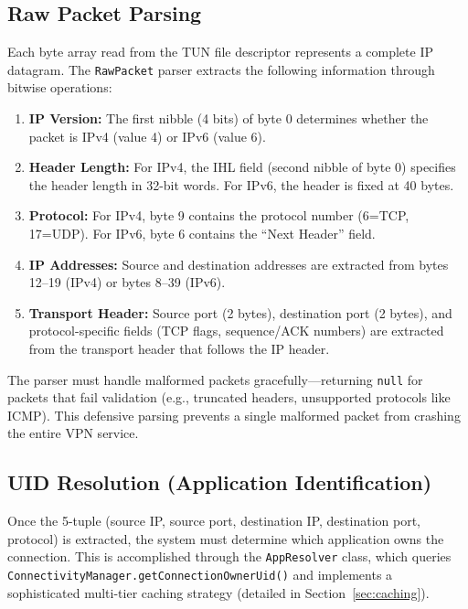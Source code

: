 \subsection{Raw Packet Parsing}

Each byte array read from the TUN file descriptor represents a complete IP datagram. The \texttt{RawPacket} parser extracts the following information through bitwise operations:

\begin{enumerate}[noitemsep]
    \item \textbf{IP Version:} The first nibble (4 bits) of byte 0 determines whether the packet is IPv4 (value 4) or IPv6 (value 6).
    \item \textbf{Header Length:} For IPv4, the IHL field (second nibble of byte 0) specifies the header length in 32-bit words. For IPv6, the header is fixed at 40 bytes.
    \item \textbf{Protocol:} For IPv4, byte 9 contains the protocol number (6=TCP, 17=UDP). For IPv6, byte 6 contains the ``Next Header'' field.
    \item \textbf{IP Addresses:} Source and destination addresses are extracted from bytes 12--19 (IPv4) or bytes 8--39 (IPv6).
    \item \textbf{Transport Header:} Source port (2 bytes), destination port (2 bytes), and protocol-specific fields (TCP flags, sequence/ACK numbers) are extracted from the transport header that follows the IP header.
\end{enumerate}

The parser must handle malformed packets gracefully---returning \texttt{null} for packets that fail validation (e.g., truncated headers, unsupported protocols like ICMP). This defensive parsing prevents a single malformed packet from crashing the entire VPN service.

\subsection{UID Resolution (Application Identification)}

Once the 5-tuple (source IP, source port, destination IP, destination port, protocol) is extracted, the system must determine which application owns the connection. This is accomplished through the \texttt{AppResolver} class, which queries \texttt{ConnectivityManager.getConnectionOwnerUid()} and implements a sophisticated multi-tier caching strategy (detailed in Section~\ref{sec:caching}).

